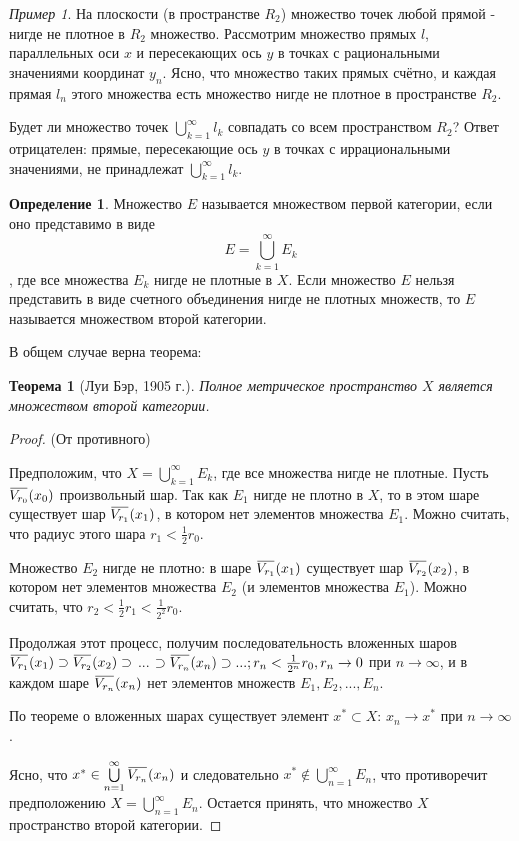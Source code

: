 \documentclass[12pt,a4paper,titlepage, oneside]{book}
\newcommand{\overbar}[1]{\mkern 1.5mu\overline{\mkern-1.5mu#1\mkern-1.5mu}\mkern 1.5mu}
\theoremstyle{definition}
\newtheorem*{definition}{Определение}
\theoremstyle{plain}
\newtheorem*{theorem}{Теорема}
\theoremstyle{remark}
\theoremstyle{remark}
\newtheorem*{example}{Пример}
\theoremstyle{remark}
\theoremstyle{plain}
\theoremstyle{plain}
\begin{document}
\begin{example}
На плоскости (в пространстве $R_2$) множество точек любой прямой - нигде не плотное в $R_2$ множество.
Рассмотрим множество прямых $l$, параллельных оси $x$ и пересекающих ось $y$ в точках с рациональными значениями координат $y_n$. Ясно, что множество таких прямых счётно, и каждая прямая $l_n$ этого множества есть множество нигде не плотное в пространстве $R_2$.
\end{example}

Будет ли множество точек $\bigcup\limits_{k=1}^\infty l_k$ совпадать со всем пространством $R_2$? Ответ отрицателен: прямые, пересекающие ось $y$ в точках с иррациональными значениями, не принадлежат $\bigcup\limits_{k=1}^\infty l_k$.

\begin{definition}
Множество $E$ называется множеством первой категории, если оно представимо в виде 
$$E=\bigcup\limits_{k=1}^\infty E_k$$, 
где все множества $E_k$ нигде не плотные в $X$. Если множество $E$ нельзя представить в виде счетного объединения нигде не плотных множеств, то $E$ называется множеством второй категории.
\end{definition}

В общем случае верна теорема:

\begin{theorem}[Луи Бэр, 1905 г.]
Полное метрическое пространство $X$ является множеством второй категории.
\end{theorem}

\begin{proof}
(От противного)

Предположим, что $X=\bigcup\limits_{k=1}^\infty E_k$, где все множества нигде не плотные. Пусть $\overbar{V_{r_0}}(x_0)$ произвольный шар. Так как $E_1$ нигде не плотно в $X$, то в этом шаре существует шар $\overbar{V_{r_1}}(x_1)$, в котором нет элементов множества $E_1$. Можно считать, что радиус этого шара $r_1 < \frac{1}{2}r_0$.

Множество $E_2$ нигде не плотно: в шаре $\overbar{V_{r_1}}(x_1)$ существует шар $\overbar{V_{r_2}}(x_2)$, в котором нет элементов множества $E_2$ (и элементов множества $E_1$). Можно считать, что $r_2 < \frac{1}{2}r_1 < \frac{1}{2^2}r_0$.

Продолжая этот процесс, получим последовательность вложенных шаров $\overbar{V_{r_1}}(x_1) \supset \overbar{V_{r_2}}(x_2) \supset$ ... $\supset \overbar{V_{r_n}}(x_n) \supset ...; r_n < \frac{1}{2^n}r_0, r_n \to 0$ при $n \to \infty$, и в каждом шаре $\overbar{V_{r_n}}(x_n)$ нет элементов множеств $E_1, E_2, ..., E_n$.

По теореме о вложенных шарах существует элемент $x^*\subset X$:
$x_n \to x^*$ при $n \to \infty$.

Ясно, что $x^*\in \bigcup\limits_{n=1}^\infty \overbar{V_{r_n}}(x_n)$ и следовательно $x^*\notin \bigcup\limits_{n=1}^\infty E_n$, что противоречит предположению $X=\bigcup\limits_{n=1}^\infty E_n$. Остается принять, что множество $X$ пространство второй категории.

\end{proof}
\end{document}
